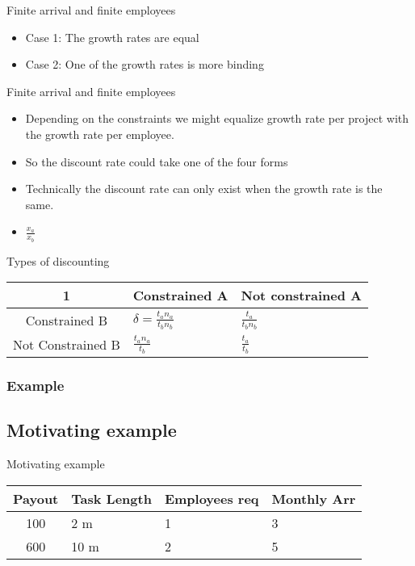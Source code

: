 \documentclass{beamer}
\numberwithin{equation}{section}
\begin{document}
\begin{frame}{Finite arrival and finite employees}
\begin{itemize}
\item Case 1: The growth rates are equal
\item Case 2: One of the growth rates is more binding
\end{itemize}
\end{frame}

\begin{frame}{Finite arrival and finite employees}
\begin{itemize}
\item Depending on the constraints we might equalize growth rate per project with the growth rate per employee.
\item So the discount rate could take one of the four forms
\item Technically the discount rate can only exist when the growth rate is the same.
\item $\frac{x_a}{x_b}$   
\end{itemize}
\end{frame}


\begin{frame}{Types of discounting}
\begin{table}[]
\begin{tabular}{|c|l|l|}
\hline
1 & Constrained A  & Not constrained A \\ \hline
Constrained B  & $\delta = \frac{t_a n_a}{t_b n_b}$ & $\frac{t_a}{t_b n_b}$                 \\ \hline
Not Constrained B &$ \frac{t_a n_a}{t_b} $ & $\frac{t_a}{t_b}$                \\ \hline
\end{tabular}
\end{table}
\end{frame}

\subsubsection{Example}
\subsection{Motivating example}
\begin{frame}{Motivating example}
\begin{table}[]
\begin{tabular}{|c|l|l|l|}
\hline
Payout     & Task Length     & Employees req   & Monthly Arr \\ \hline
100 & 2 m  & 1 & 3                  \\ \hline
600 & 10 m & 2 & 5                  \\ \hline
\end{tabular}
\end{table}
\end{frame}
\end{document}
